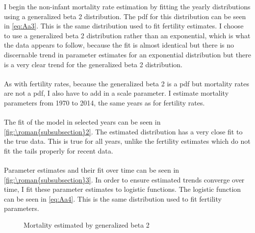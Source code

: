 \documentclass{article}
\renewcommand{\thesubsubsection}{\roman{subsubsection}}
\numberwithin{equation}{subsection}
\newcommand*{\FigureDir}{../../graphs}
\begin{document}
\begin{appendices}
\noindent
I begin the non-infant mortality rate estimation by fitting the yearly distributions using a generalized beta 2 distribution. The pdf for this distribution can be seen in \ref{eq:Aa3}. This is the same distribution used to fit fertility estimates. I choose to use a generalized beta 2 distribution rather than an exponential, which is what the data appears to follow, because the fit is almost identical but there is no discernable trend in parameter estimates for an exponential distribution but there is a very clear trend for the generalized beta 2 distribution.
\\\\
As with fertility rates, because the generalized beta 2 is a pdf but mortality rates are not a pdf, I also have to add in a scale parameter. I estimate mortality parameters from 1970 to 2014, the same years as for fertility rates.
\\\\
The fit of the model in selected years can be seen in \autoref{fig:\thesubsubsection2}. The estimated distribution has a very close fit to the true data. This is true for all years, unlike the fertility estimates which do not fit the tails properly for recent data.
\\\\
Parameter estimates and their fit over time can be seen in \autoref{fig:\thesubsubsection3}. In order to ensure estimated trends converge over time, I fit these parameter estimates to logistic functions. The logistic function can be seen in \ref{eq:Aa4}. This is the same distribution used to fit fertility parameters.

\begin{figure}[H]
   \centering
   \caption{\label{fig:\thesubsubsection2}Mortality estimated by generalized beta 2}
\end{figure}


\end{appendices}
\end{document}
